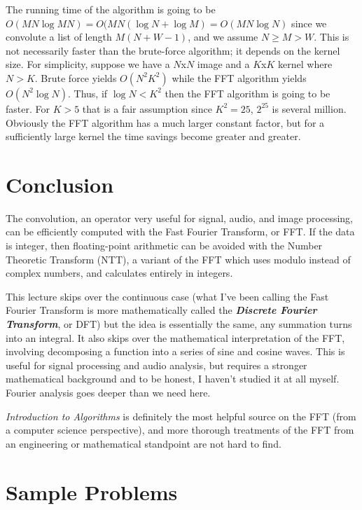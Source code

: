\documentclass[11pt, oneside]{article}
\newcommand{\emphasis}[1]{\textbf{\textit{#1}}}
\theoremstyle{plain}
\theoremstyle{definition}
\begin{document}
\newpage

The running time of the algorithm is going to be
\( O(MN \log MN) = O(MN(\log N + \log M) = O(MN \log N) \) since we convolute 
a list of length \( M(N + W - 1) \), and we assume \( N \geq M > W \).
This is not necessarily faster than the brute-force algorithm;
it depends on the kernel size. For simplicity, suppose we have a \( N \)x\( N \)
image and a \( K \)x\( K \) kernel where \( N > K \). Brute force yields
\( O(N^2 K^2) \) while the FFT algorithm yields \( O(N^2 \log N) \).
Thus, if \( \log N < K^2 \) then the FFT algorithm is going to be faster.
For \( K > 5 \) that is a fair assumption since \( K^2 = 25 \), \( 2^{25} \)
is several million. Obviously the FFT algorithm has a much larger constant
factor, but for a sufficiently large kernel the time savings become greater
and greater.

\section{Conclusion}

The convolution, an operator very useful for signal, audio, and image
processing, can be efficiently computed with the Fast Fourier Transform, or FFT.
If the data is integer, then floating-point arithmetic can be avoided with the
Number Theoretic Transform (NTT), a variant of the FFT which uses modulo
instead of complex numbers, and calculates entirely in integers.

This lecture skips over the continuous case (what I've been calling the 
Fast Fourier Transform is more mathematically called the
\emphasis{Discrete Fourier Transform}, or DFT) but the idea is essentially the
same, any summation turns into an integral. It also skips over the mathematical
interpretation of the FFT, involving decomposing a function into a series of
sine and cosine waves. This is useful for signal processing and audio analysis,
but requires a stronger mathematical background and to be honest, I haven't
studied it at all myself. Fourier analysis goes deeper than we need here. 

\textit{Introduction to Algorithms} is definitely the most helpful source on
the FFT (from a computer science perspective), and more thorough treatments of
the FFT from an engineering or mathematical standpoint are not hard to find.

\newpage

\section{Sample Problems}
\end{document}
